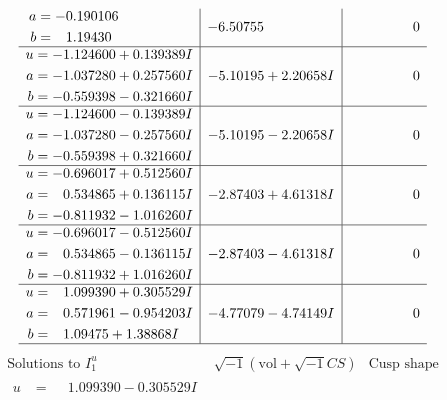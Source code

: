 \documentclass[1p]{elsarticle_modified}
\theoremstyle{definition}
\newcommand{\I}{\sqrt{-1}}
\begin{document}
$$\begin{array}{c|c|c}
\begin{aligned}
a &= -0.190106\phantom{ +0.000000I} \\
b &= \phantom{-}1.19430\phantom{ +0.000000I}\end{aligned}
 & -6.50755\phantom{ +0.000000I} & \phantom{-0.000000 } 0 \\ \hline\begin{aligned}
u &= -1.124600 + 0.139389 I \\
a &= -1.037280 + 0.257560 I \\
b &= -0.559398 - 0.321660 I\end{aligned}
 & -5.10195 + 2.20658 I & \phantom{-0.000000 } 0 \\ \hline\begin{aligned}
u &= -1.124600 - 0.139389 I \\
a &= -1.037280 - 0.257560 I \\
b &= -0.559398 + 0.321660 I\end{aligned}
 & -5.10195 - 2.20658 I & \phantom{-0.000000 } 0 \\ \hline\begin{aligned}
u &= -0.696017 + 0.512560 I \\
a &= \phantom{-}0.534865 + 0.136115 I \\
b &= -0.811932 - 1.016260 I\end{aligned}
 & -2.87403 + 4.61318 I & \phantom{-0.000000 } 0 \\ \hline\begin{aligned}
u &= -0.696017 - 0.512560 I \\
a &= \phantom{-}0.534865 - 0.136115 I \\
b &= -0.811932 + 1.016260 I\end{aligned}
 & -2.87403 - 4.61318 I & \phantom{-0.000000 } 0 \\ \hline\begin{aligned}
u &= \phantom{-}1.099390 + 0.305529 I \\
a &= \phantom{-}0.571961 - 0.954203 I \\
b &= \phantom{-}1.09475 + 1.38868 I\end{aligned}
 & -4.77079 - 4.74149 I & \phantom{-0.000000 } 0\\
 \hline 
 \end{array}$$\newpage$$\begin{array}{c|c|c}  
\text{Solutions to }I^u_{1}& \I (\text{vol} + \sqrt{-1}CS) & \text{Cusp shape}\\
 \hline 
\begin{aligned}
u &= \phantom{-}1.099390 - 0.305529 I \\

\end{aligned}
\end{array}$$
\end{document}
